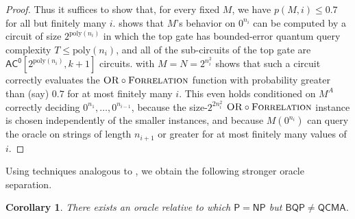 \documentclass[11pt]{article}%
\newtheorem{corollary}[theorem]{Corollary}
\newcommand{\poly}{\mathrm{poly}}
\newcommand{\OR}{\normalfont\textsc{OR}}
\newcommand{\Forrelation}{\normalfont\textsc{Forrelation}}
\begin{document}
\begin{proof}
\noindent Thus it suffices to show that, for every fixed $M$, we have $p(M,i)\leq 0.7$ for all but finitely many $i$.  shows that $M$'s behavior on $0^{n_i}$ can be computed by a circuit of size $2^{\poly(n_i)}$ in which the top gate has bounded-error quantum query complexity $T \le \poly(n_i)$, and all of the sub-circuits of the top gate are $\mathsf{AC^0}\left[2^{\poly(n_i)}, k+1\right]$ circuits.  with $M = N = 2^{n_i^2}$ shows that such a circuit correctly evaluates the $\OR \circ \Forrelation$ function with probability greater than (say) $0.7$ for at most finitely many $i$. This even holds conditioned on $M^A$ correctly deciding $0^{n_1},\ldots,0^{n_{i-1}}$, because the size-$2^{2n_i^2}$ $\OR \circ \Forrelation$ instance is chosen independently of the smaller instances, and because $M\left(0^{n_i}\right)$ can query the oracle on strings of length $n_{i+1}$ or greater for at most finitely many values of $i$.
\end{proof}

Using techniques analogous to , we obtain the following stronger oracle separation.

\begin{corollary}
\label{cor:p=np_bqp!=qcma}
There exists an oracle relative to which $\mathsf{P} = \mathsf{NP}$ but $\mathsf{BQP} \neq \mathsf{QCMA}$.
\end{corollary}
\end{document}
